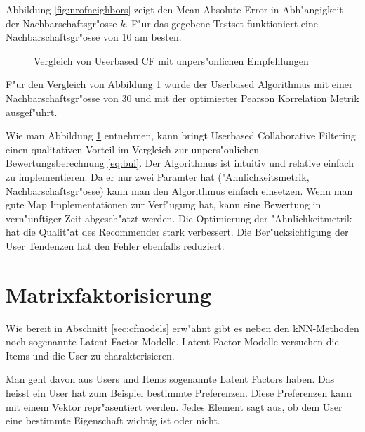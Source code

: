 \documentclass[a4paper, 12pt]{article}
\begin{document}
Abbildung \ref{fig:nrofneighbors} zeigt den Mean Absolute Error in Abh"angigkeit der Nachbarschaftsgr"osse $k$. F"ur das gegebene Testset funktioniert eine Nachbarschaftsgr"osse von 10 am besten.

\begin{figure}
  \centering
{}
\label{fig:uuvsbui}
\caption{Vergleich von Userbased CF mit unpers"onlichen Empfehlungen}
\end{figure}

F"ur den Vergleich von Abbildung \ref{fig:uuvsbui} wurde der Userbased Algorithmus mit einer Nachbarschaftsgr"osse von 30 und mit der optimierter Pearson Korrelation Metrik ausgef"uhrt. 

Wie man Abbildung \ref{fig:uuvsbui} entnehmen, kann bringt Userbased Collaborative Filtering einen qualitativen Vorteil im Vergleich zur unpers"onlichen Bewertungsberechnung \ref{eq:bui}. Der Algorithmus ist intuitiv und relative einfach zu implementieren. Da er nur zwei Paramter hat ("Ahnlichkeitsmetrik, Nachbarschaftsgr"osse) kann man den Algorithmus einfach einsetzen. Wenn man gute Map Implementationen zur Verf"ugung hat, kann eine Bewertung in vern"unftiger Zeit abgesch"atzt werden.
Die Optimierung der "Ahnlichkeitmetrik hat die Qualit"at des Recommender stark verbessert. Die Ber"ucksichtigung der User Tendenzen hat den Fehler ebenfalls reduziert.

\section{Matrixfaktorisierung}
\label{sec:matrixfactorization}

Wie bereit in Abschnitt \ref{sec:cfmodels} erw"ahnt gibt es neben den kNN-Methoden noch sogenannte Latent Factor Modelle. Latent Factor Modelle versuchen die Items und die User zu charakterisieren. 

Man geht davon aus Users und Items sogenannte Latent Factors haben. Das heisst ein User hat zum Beispiel bestimmte Preferenzen. Diese Preferenzen kann mit einem Vektor repr"asentiert werden. Jedes Element sagt aus, ob dem User eine bestimmte Eigenschaft wichtig ist oder nicht. 
\end{document}
